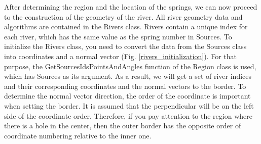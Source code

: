\documentclass[]{pracamgr}
\begin{document}
      After determining the region and the location of the springs, we can now proceed to the construction of the geometry of the river. All river geometry data and algorithms are contained in the Rivers class. Rivers contain a unique index for each river, which has the same value as the spring number in Sources. To initialize the Rivers class, you need to convert the data from the Sources class into coordinates and a normal vector (Fig. \ref{rivers_initialization}). For that purpose, the GetSourcesIdsPointsAndAngles function of the Region class is used, which has Sources as its argument. As a result, we will get a set of river indices and their corresponding coordinates and the normal vectors to the border. To determine the normal vector direction, the order of the coordinate is important when setting the border. It is assumed that the perpendicular will be on the left side of the coordinate order. Therefore, if you pay attention to the region where there is a hole in the center, then the outer border has the opposite order of coordinate numbering relative to the inner one.
      
\end{document}
